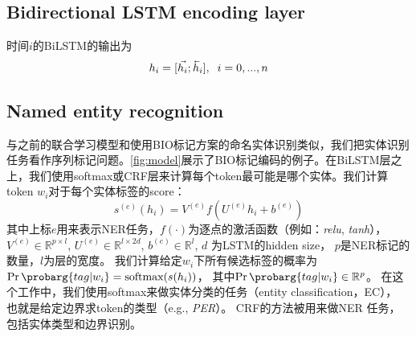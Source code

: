 \documentclass[a4paper,UTF8,no-math,zihao=-4]{ctexart}
\newcommand{\prob}{\operatorname{Pr}\probarg}
\newcommand{\cev}[1]{\reflectbox{\ensuremath{\vec{\reflectbox{\ensuremath{#1}}}}}}
\newcommand{\eg}{e.g., }
\begin{document}
	\subsection{Bidirectional LSTM encoding layer}
	
	
	时间$i$的BiLSTM的输出为\begin{equation}
	h_i= [\vec{h_i};\cev{h_i}],\;\; i=0,...,n
	\end{equation}
	
	\subsection{Named entity recognition}
	
	与之前的联合学习模型和使用BIO标记方案的命名实体识别类似，我们把实体识别任务看作序列标记问题。\autoref{fig:model}展示了BIO标记编码的例子。在BiLSTM层之上，我们使用softmax或CRF层来计算每个token最可能是哪个实体。我们计算token $ w_{i} $对于每个实体标签的score：\begin{equation}
	s^{(e)}(h_i)= V^{(e)} f (U^{(e)}  h_i +b^{(e)})
	\end{equation}
	其中上标$ e $用来表示NER任务，$f(\cdot)$为逐点的激活函数（例如：\emph{relu}, \emph{tanh}），
	$V^{(e)} \in \mathbb{R}^{p\times l}$, 
	$U^{(e)} \in \mathbb{R}^{l \times 2d}$, 
	$b^{(e)} \in \mathbb{R}^{l}$,  
	$d$ 为LSTM的hidden size，
	$p$是NER标记的数量，$l$为层的宽度。
	我们计算给定$w_i$下所有候选标签的概率为$\prob{tag | w_i}=\text{softmax}(s(h_i))$，
	其中$\prob{tag | w_i} \in \mathbb{R}^{p}$。
	在这个工作中，我们使用softmax来做实体分类的任务（entity classification，EC），
	也就是给定边界求token的类型（\eg \emph{PER}）。
	CRF的方法被用来做NER 任务，包括实体类型和边界识别。
	
	
	
\end{document}
